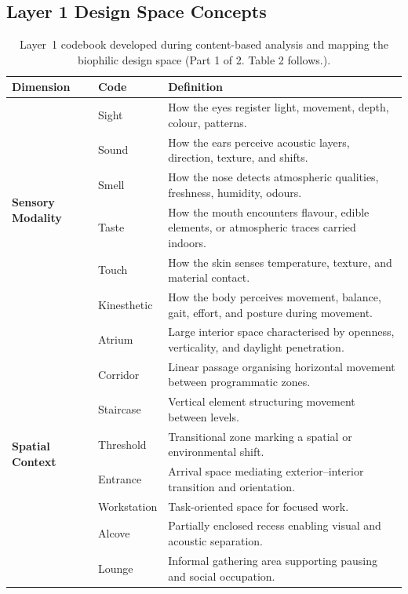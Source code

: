 \subsection{Layer 1 Design Space Concepts}
\begin{table}[!ht]
\caption{Layer~1 codebook developed during content-based analysis and mapping the biophilic design space (Part 1 of 2. Table 2 follows.).}
\label{tab:layer1-codebook}
\centering
\begin{tabular}{@{}
  p{}
  p{}
  p{}
@{}}
\toprule
\textbf{Dimension} & \textbf{Code} & \textbf{Definition} \\
\midrule
\multirow{6}{=}{\centering\textbf{Sensory Modality}} 
& Sight & How the eyes register light, movement, depth, colour, patterns. \\
& Sound & How the ears perceive acoustic layers, direction, texture, and shifts. \\
& Smell & How the nose detects atmospheric qualities, freshness, humidity, odours. \\
& Taste & How the mouth encounters flavour, edible elements, or atmospheric traces carried indoors. \\
& Touch & How the skin senses temperature, texture, and material contact. \\
& Kinesthetic & How the body perceives movement, balance, gait, effort, and posture during movement. \\
\midrule
\multirow{9}{=}{\centering\textbf{Spatial Context}}  & Atrium & Large interior space characterised by openness, verticality, and daylight penetration. \\
& Corridor & Linear passage organising horizontal movement between programmatic zones. \\
& Staircase & Vertical element structuring movement between levels. \\
& Threshold & Transitional zone marking a spatial or environmental shift. \\
& Entrance & Arrival space mediating exterior--interior transition and orientation. \\
& Workstation & Task-oriented space for focused work. \\
& Alcove & Partially enclosed recess enabling visual and acoustic separation. \\
& Lounge & Informal gathering area supporting pausing and social occupation. \\

\end{tabular}
\end{table}
